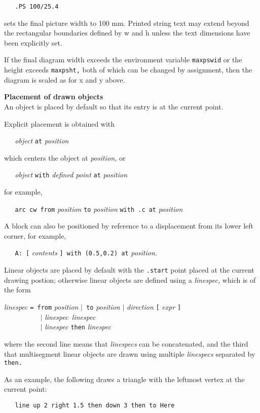 {\tt \ \ \ .PS\ 100/25.4}

sets the final picture width to 100 mm.
Printed string text may extend beyond the rectangular boundaries
defined by w and h unless the text dimensions have been explicitly set.

If the final diagram width exceeds the environment variable
{\tt maxpswid}
or the height exceeds
{\tt maxpsht,}
both of which can be changed by assignment,
then the diagram is scaled as for x and y above.
% 
\par\hskip-2pc{\bf Placement of drawn objects}\\
An object is placed by default so that its entry is at
the current point.

Explicit placement is obtained with

{\it \ \ \ object}
{\tt at}
{\it position}

which centers the object at
{\it position,}
or

{\it \ \ \ object}
{\tt with}
{\it defined point}
{\tt at}
{\it position}

for example,

{\tt \ \ \ arc\ cw\ from}
{\it position}
{\tt to}
{\it position}
{\tt with\ .c\ at}
{\it position}

A block can also be positioned by reference to a displacement from its
lower left corner, for example,

{\tt \ \ \ A:\ [}
{\it contents}
{\tt ]\ with\ (0.5,0.2)\ at}
{\it position.}

Linear objects are placed by default with the
{\tt .start}
point placed at the current drawing
postion; otherwise linear objects are defined using a
{\it linespec,}
which is of the form

{\it linespec}
{\tt =\ from}
{\it position}
{\tt $|$\ to}
{\it position}
{\tt $|$}
{\it direction}
{\tt [}
{\it expr}
{\tt ]}
\\\hbox{}\hskip-1pt
{\tt \ \ \ \ \ \ \ \ \ \ $|$}
{\it linespec\ linespec}
\\\hbox{}\hskip-1pt
{\tt \ \ \ \ \ \ \ \ \ \ $|$}
{\it linespec}
{\tt then}
{\it linespec}

where
the second line means that
{\it linespecs}
can be concatenated, and the third
that multisegment linear objects are drawn using multiple
{\it linespecs}
separated by
{\tt then.}

As an example, the following draws a triangle with the leftmost vertex
at the current point:

{\tt \ \ \ line\ up\ 2\ right\ 1.5\ then\ down\ 3\ then\ to\ Here}

